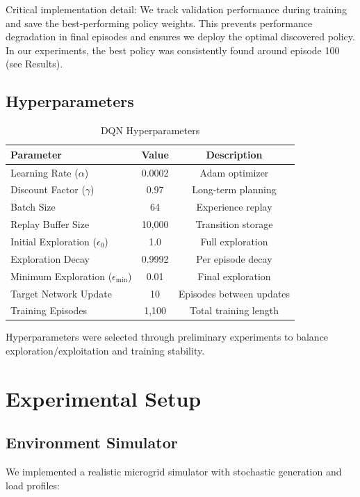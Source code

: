 \documentclass[11pt,a4paper]{article}
\begin{document}
Critical implementation detail: We track validation performance during training and save the best-performing policy weights. This prevents performance degradation in final episodes and ensures we deploy the optimal discovered policy. In our experiments, the best policy was consistently found around episode 100 (see Results).

\subsection{Hyperparameters}

\begin{table}[h]
\centering
\caption{DQN Hyperparameters}
\label{tab:hyperparameters}
\begin{tabular}{lcc}
\toprule
\textbf{Parameter} & \textbf{Value} & \textbf{Description} \\
\midrule
Learning Rate ($\alpha$) & 0.0002 & Adam optimizer \\
Discount Factor ($\gamma$) & 0.97 & Long-term planning \\
Batch Size & 64 & Experience replay \\
Replay Buffer Size & 10,000 & Transition storage \\
Initial Exploration ($\epsilon_0$) & 1.0 & Full exploration \\
Exploration Decay & 0.9992 & Per episode decay \\
Minimum Exploration ($\epsilon_{\text{min}}$) & 0.01 & Final exploration \\
Target Network Update & 10 & Episodes between updates \\
Training Episodes & 1,100 & Total training length \\
\bottomrule
\end{tabular}
\end{table}

Hyperparameters were selected through preliminary experiments to balance exploration/exploitation and training stability.

\section{Experimental Setup}
\label{sec:experiments}

\subsection{Environment Simulator}

We implemented a realistic microgrid simulator with stochastic generation and load profiles:
\end{document}

